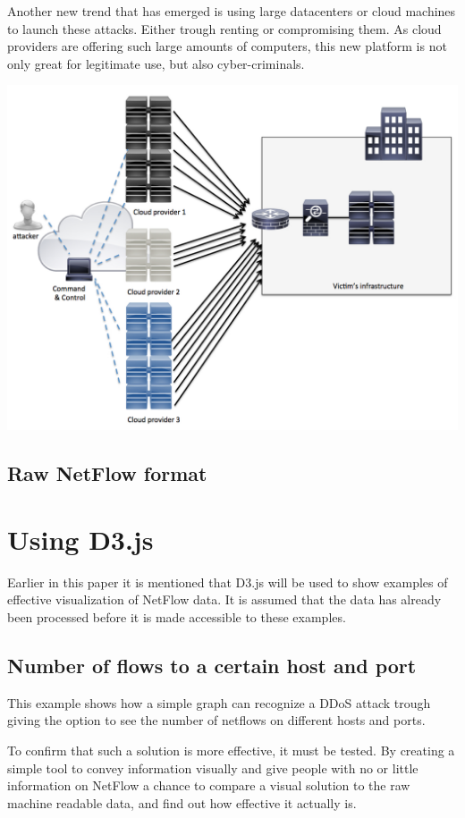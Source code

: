 Another new trend that has emerged is using large datacenters or cloud machines to launch these attacks. Either trough renting or compromising them. As cloud providers are offering such large amounts of computers, this new platform is not only great for legitimate use, but also cyber-criminals.

\includegraphics[scale=0.2]{cloud}

\subsection{Raw NetFlow format}


\section{Using D3.js}
Earlier in this paper it is mentioned that D3.js will be used to show examples of effective visualization of NetFlow data. It is assumed that the data has already been processed before it is made accessible to these examples. 

\subsection{Number of flows to a certain host and port}
This example shows how a simple graph can recognize a DDoS attack trough giving the option to see the number of netflows on different hosts and ports. 


To confirm that such a solution is more effective, it must be tested. By creating a simple tool to convey information visually and give people with no or little information on NetFlow a chance to compare a visual solution to the raw machine readable data, and find out how effective it actually is.  

